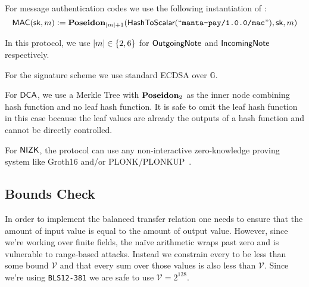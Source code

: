 \begin{definition}
    For message authentication codes we use the following instantiation of \Poseidon{}:
    \[{\textsf{MAC}}({\textsf{sk}}, m) := {\textbf{Poseidon}}_{\left|m\right| + 1}({\textsf{HashToScalar}}({``\texttt{manta-pay/1.0.0/mac}"}), {\textsf{sk}}, m)\]

    In this protocol, we use $|m| \in \set{2, 6}$ for ${\textsf{OutgoingNote}}$ and ${\textsf{IncomingNote}}$ respectively.
\end{definition}

\begin{definition}
    For the signature scheme we use standard ECDSA over $\mathbb{G}$.
\end{definition}

\begin{definition}
    For ${\textsf{DCA}}$, we use a Merkle Tree with ${\textbf{Poseidon}}_2$ as the inner node combining hash function and no leaf hash function. It is safe to omit the leaf hash function in this case because the leaf values are already the outputs of a hash function and cannot be directly controlled.
\end{definition}

\begin{definition} \label{def:concrete-zkp}
    For ${\textsf{NIZK}}$, the protocol can use any non-interactive zero-knowledge proving system like Groth16 \cite{KRRS21USENIX} and/or PLONK/PLONKUP~\cite{plonk,plonkup}. 
\end{definition}

\subsection{\AssetValue{} Bounds Check}

In order to implement the balanced transfer relation one needs to ensure that the amount of input value is equal to the amount of output value. However, since we're working over finite fields, the na\"ive arithmetic wraps past zero and is vulnerable to range-based attacks. Instead we constrain every \AssetValue{} to be less than some bound $\mathcal{V}$ and that every sum over those values is also less than $\mathcal{V}$. Since we're using \texttt{BLS12-381} we are safe to use $\mathcal{V} = 2^{128}$.

